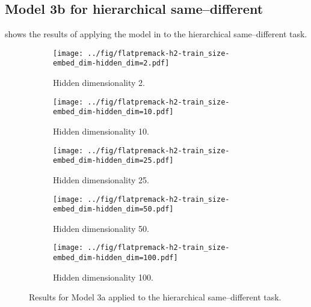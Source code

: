 \newpage


\subsection{Model 3b for hierarchical same--different}

 shows the results of applying the model in  to the hierarchical same--different task. 

\begin{figure}[H]
  \centering

  \begin{subfigure}{0.45\linewidth}
    \texttt{[image: ../fig/flatpremack-h2-train\_size-embed\_dim-hidden\_dim=2.pdf]}
    \caption{Hidden dimensionality 2.}
  \end{subfigure}
  \hfill
  \begin{subfigure}{0.45\linewidth}
    \texttt{[image: ../fig/flatpremack-h2-train\_size-embed\_dim-hidden\_dim=10.pdf]}
    \caption{Hidden dimensionality 10.}
  \end{subfigure}

  \vspace{24pt}

  \begin{subfigure}{0.45\linewidth}
    \texttt{[image: ../fig/flatpremack-h2-train\_size-embed\_dim-hidden\_dim=25.pdf]}
    \caption{Hidden dimensionality 25.}
  \end{subfigure}
  \hfill
  \begin{subfigure}{0.45\linewidth}
    \texttt{[image: ../fig/flatpremack-h2-train\_size-embed\_dim-hidden\_dim=50.pdf]}
    \caption{Hidden dimensionality 50.}
  \end{subfigure}

  \vspace{24pt}

  \begin{subfigure}{0.45\linewidth}
    \texttt{[image: ../fig/flatpremack-h2-train\_size-embed\_dim-hidden\_dim=100.pdf]}
    \caption{Hidden dimensionality 100.}
    \label{fig:model3a-rep}
  \end{subfigure}
  \caption{Results for Model 3a applied to the hierarchical same--different task. }
  \label{fig:model3a}
\end{figure}

